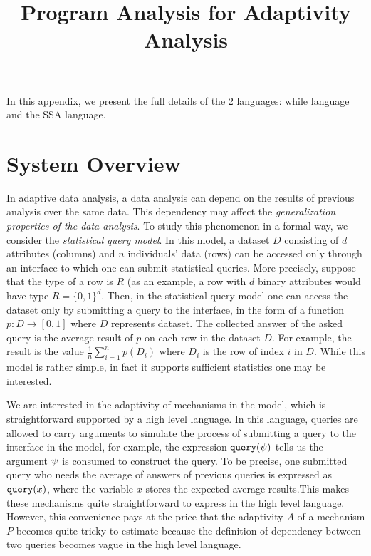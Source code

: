 \documentclass[a4paper,11pt]{article}
\begin{document}
\title{Program Analysis for Adaptivity Analysis}

\author{}

\date{}

\maketitle

In this appendix, we present the full details of the 2 languages: while language and the SSA language.

\tableofcontents


\section{System Overview}


In adaptive data analysis, a data analysis can depend on the results of
previous analysis over the same data. This dependency may affect the
\emph{generalization properties of the data analysis}. To study this phenomenon
in a formal way, we consider the \emph{statistical query
  model}. In this model, a dataset $D$ consisting of $d$ attributes (columns) and $n$
individuals' data (rows) can be accessed only through an interface to
which one can submit statistical queries. More precisely, suppose that
the type of a row is $R$ (as an example, a row with $d$ binary
attributes would have type $R=\{0,1\}^d$. Then, in the statistical
query model one can access the dataset only by submitting a query to
the interface, in
the form of a function
$p:D\to [0,1] $ where $D$ represents dataset. The collected answer of
the asked query is the average result of $p$ on each row in the
dataset $D$. For example, the result is the
value $\frac{1}{n}\sum_{i=1}^n p(D_i)$ where
$D_i$ is the row of index $i$ in $D$. While this model is rather
simple, in fact it supports sufficient statistics one may be
interested.

 

We are interested in the adaptivity of mechanisms in the model, which is straightforward supported by a high level language. In this language, queries are allowed to carry arguments to simulate the process of submitting a query to the interface in
the model, for example, the expression ${\tt query}(\psi)$ tells us the argument $\psi$ is consumed to construct the
query. To be precise, one submitted query who needs the average of
answers of previous queries is expressed as ${\tt query}(x)$, where the variable $x$ stores
the expected average results.This makes these mechanisms quite straightforward to express in the high level language. However, this convenience pays at the price that the adaptivity $A$ of a mechanism $P$ becomes quite tricky to estimate because the definition of dependency between two queries becomes vague in the high level language. 
\end{document}
